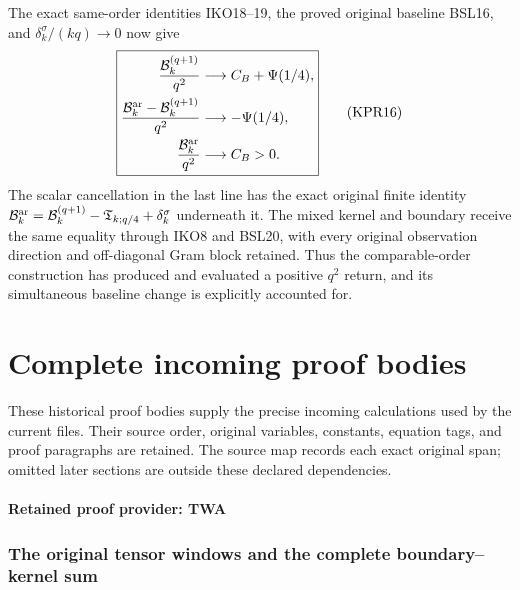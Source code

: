 \documentclass[11pt,a4paper]{article}
\newcommand{\C}{\mathbb C}
\newcommand{\R}{\mathbb R}
\begin{document}
The exact same-order identities IKO18--19, the proved original
baseline BSL16, and $\delta_k^\sigma/(kq)\to0$ now give
\[
 \boxed{\begin{aligned}
 \frac{\mathcal B_k^{(q+1)}}{q^2}&\longrightarrow C_B+\Psi(1/4),\\
 \frac{\mathcal B_k^{\rm ar}-\mathcal B_k^{(q+1)}}{q^2}
       &\longrightarrow-\Psi(1/4),\\
 \frac{\mathcal B_k^{\rm ar}}{q^2}&\longrightarrow C_B>0.
 \end{aligned}}
 \tag{KPR16}
\]
The scalar cancellation in the last line has the exact original
finite identity
$\mathcal B_k^{\rm ar}=\mathcal B_k^{(q+1)}
 -\mathfrak T_{k;q/4}+\delta_k^\sigma$ underneath it.
The mixed kernel and boundary receive the same equality through
IKO8 and BSL20, with every original observation direction and
off-diagonal Gram block retained. Thus the comparable-order
construction has produced and evaluated a positive $q^2$ return,
and its simultaneous baseline change is explicitly accounted for.



\clearpage
\part{Complete incoming proof bodies}
\noindent These historical proof bodies supply the precise incoming calculations used by the current files. Their source order, original variables, constants, equation tags, and proof paragraphs are retained. The source map records each exact original span; omitted later sections are outside these declared dependencies.\par
\begingroup
\providecommand{\Tr}{\operatorname{Tr}}
\providecommand{\diag}{\operatorname{diag}}
\providecommand{\im}{\operatorname{im}}
\providecommand{\cR}{\mathcal R}
\providecommand{\cP}{\mathcal P}
\providecommand{\R}{\mathbb R}
\providecommand{\C}{\mathbb C}

\clearpage
\subsection*{Retained proof provider: TWA}

\section{The original tensor windows and the complete boundary--kernel sum}
\label{sec:twa-original-tensor-windows}
\end{document}
